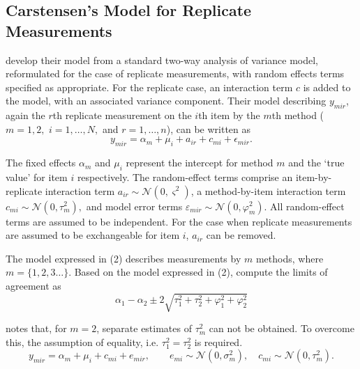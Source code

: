 \documentclass[12pt, a4paper]{report}
\theoremstyle{plain}
\theoremstyle{definition}
\theoremstyle{remark}
\begin{document}
\subsection{Carstensen's Model for Replicate Measurements}





\citet{BXC2008} develop their model from a standard two-way analysis of variance model, reformulated for the case of replicate measurements, with random effects terms specified as appropriate. 
For the replicate case, an interaction term $c$ is added to the model, with an associated variance component. Their model describing $y_{mir} $, again the $r$th replicate measurement on the $i$th item by the $m$th method ($m=1,2,$ $i=1,\ldots,N,$ and $r = 1,\ldots,n$), can be written as
\begin{equation}\label{BXC-model}
y_{mir}  = \alpha_{m} + \mu_{i} + a_{ir} + c_{mi} + \epsilon_{mir}.
\end{equation}

The fixed effects $\alpha_{m}$ and $\mu_{i}$ represent the intercept for method $m$ and the `true value' for item $i$ respectively. The random-effect terms comprise an item-by-replicate interaction term $a_{ir} \sim \mathcal{N}(0,\varsigma^{2})$, a method-by-item interaction term $c_{mi} \sim \mathcal{N}(0,\tau^{2}_{m}),$ and model error terms $\varepsilon_{mir} \sim \mathcal{N}(0,\varphi^{2}_{m}).$ All random-effect terms are assumed to be independent. For the case when replicate measurements are assumed to be exchangeable for item $i$, $a_{ir}$ can be removed. 


The model expressed in (2) describes measurements by $m$ methods, where $m = \{1,2,3\ldots\}$. Based on the model expressed in (2), \citet{BXC2008} compute the limits of agreement as
\[
\alpha_1 - \alpha_2 \pm 2 \sqrt{ \tau^2_1 +  \tau^2_2 +  \varphi^2_1 +  \varphi^2_2 }
\]

\citet{BXC2008} notes that, for $m=2$, separate estimates of $\tau^2_m$ can not be obtained. To overcome this, the assumption of equality, i.e. $\tau^2_1 = \tau^2_2$ is required.
\begin{equation}
y_{mir}  = \alpha_{m} + \mu_{i} + c_{mi} + e_{mir}, \qquad  e_{mi}
\sim \mathcal{N}(0,\sigma^{2}_{m}), \quad c_{mi} \sim \mathcal{N}(0,\tau^{2}_{m}).
\end{equation}
\end{document}
